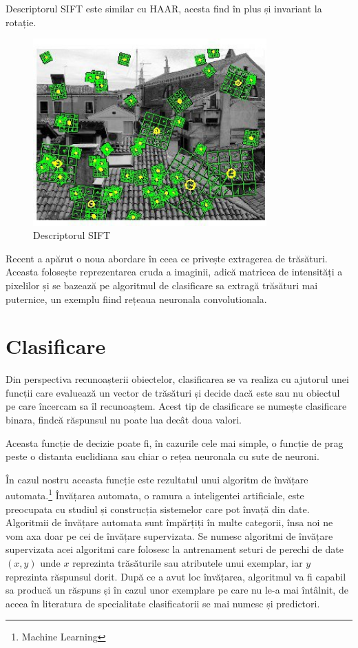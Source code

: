 Descriptorul SIFT este similar cu HAAR, acesta find în plus și invariant la rotație.
\begin{figure}[H]
	\centering
		\includegraphics[width=0.80\textwidth]{imagini/sift0.jpg}
	\caption{Descriptorul SIFT\footnotemark}
	\label{fig:sift}
\end{figure}

Recent a apărut o noua abordare în ceea ce privește extragerea de trăsături.
Aceasta folosește reprezentarea cruda a imaginii, adică matricea de intensități a pixelilor și se bazează pe algoritmul de clasificare sa extragă trăsături mai puternice, un exemplu fiind rețeaua neuronala convolutionala.\cite{lecun-98}

\pagebreak
\section{Clasificare}

Din perspectiva recunoașterii obiectelor, clasificarea se va realiza cu ajutorul unei funcții care evaluează un vector de trăsături și decide dacă este sau nu obiectul pe care încercam sa îl recunoaștem. 
Acest tip de clasificare se numește clasificare binara, findcă răspunsul nu poate lua decât doua valori.

Aceasta funcție de decizie poate fi, în cazurile cele mai simple, o funcție de prag peste o distanta euclidiana sau chiar o rețea neuronala cu sute de neuroni.

În cazul nostru aceasta funcție este rezultatul unui algoritm de învățare automata.\footnote{Machine Learning}
Învățarea automata, o ramura a inteligentei artificiale, este preocupata cu studiul și construcția sistemelor care pot învață din date.
Algoritmii de învățare automata sunt împărțiți în multe categorii, însa noi ne vom axa doar pe cei de învățare supervizata.
Se numesc algoritmi de învățare supervizata acei algoritmi care folosesc la antrenament seturi de perechi de date ${(x,y)}$ unde ${x}$ reprezinta trăsăturile sau atributele unui exemplar, iar ${y}$ reprezinta răspunsul dorit. 
După ce a avut loc învățarea, algoritmul va fi capabil sa producă un răspuns și în cazul unor exemplare pe care nu le-a mai întâlnit, de aceea în literatura de specialitate clasificatorii se mai numesc și predictori.

